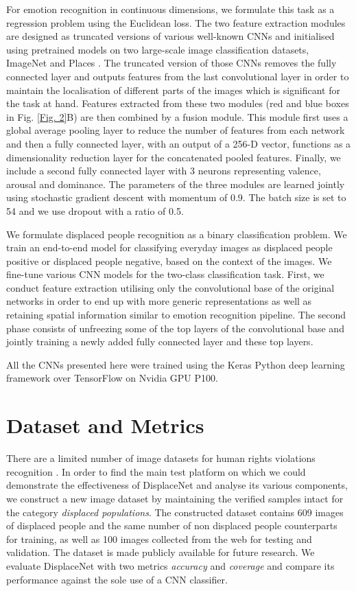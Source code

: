 \documentclass[10pt,twocolumn,letterpaper]{article}
\begin{document}
For emotion recognition in continuous dimensions, we formulate this task as a regression problem using the Euclidean loss. The two feature extraction modules are designed as truncated versions of various well-known CNNs and initialised using pretrained models on two large-scale image classification datasets, ImageNet \cite{krizhevsky2012imagenet} and Places \cite{zhou2018places}. The truncated version of those CNNs removes the fully connected layer and outputs features from the last convolutional layer in order to maintain the localisation of different parts of the images which is significant for the task at hand. Features extracted from these two modules (red and blue boxes in Fig. \ref{Fig. 2}B) are then combined by a fusion module. This module first uses a global average pooling layer to reduce the number of features from each network and then a fully connected layer, with an output of a 256-D vector,  functions as a dimensionality reduction layer for the concatenated pooled features. Finally, we include a second fully connected layer with 3 neurons representing valence, arousal and dominance. The parameters of the three modules are learned jointly using stochastic gradient descent with momentum of 0.9. The batch size is set to 54 and we use dropout with a ratio of 0.5.

We formulate displaced people recognition as a binary classification problem. We train an end-to-end model for classifying everyday images as displaced people positive or displaced people negative, based on the context of the images. We fine-tune various CNN models for the two-class classification task. First, we conduct feature extraction utilising only the convolutional base of the original networks in order to end up with more generic representations as well as retaining spatial information similar to emotion recognition pipeline. The second phase consists of unfreezing some of the top layers of the convolutional base and jointly training a newly added fully connected layer and these top layers.

All the CNNs presented here were trained using the Keras Python deep learning framework \cite{chollet2015keras} over TensorFlow \cite{abadi2016tensorflow} on Nvidia GPU P100.


\section{Dataset and Metrics}

There are a limited number of image datasets for human rights violations recognition \cite{kalliatakis2019exploring, visapp17}. In order to find the main test platform on which we could demonstrate the effectiveness of DisplaceNet and analyse its various components, we construct a new image dataset by maintaining the verified samples intact for the category \textit{displaced populations}. The constructed dataset contains 609 images of displaced people and the same number of non displaced people counterparts for training, as well as 100 images collected from the web for testing and validation. The dataset is made publicly available for future research.
We evaluate DisplaceNet with two metrics \textit{accuracy} and \textit{coverage} and compare its performance against the sole use of a CNN classifier.
\end{document}
